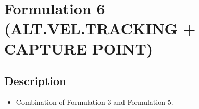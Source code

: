 \section{Formulation 6 (ALT.VEL.TRACKING + CAPTURE POINT)}\label{sec.form06}


\subsection{Description}
\begin{itemize}
    \item Combination of Formulation 3 and Formulation 5.
\end{itemize}


